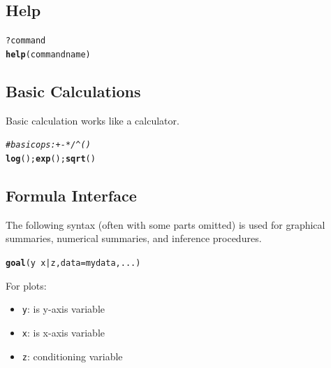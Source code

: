 \documentclass[10pt]{report}\usepackage[]{graphicx}\usepackage[]{xcolor}
\makeatletter
\newcommand{\hlcom}[1]{\textcolor[rgb]{0.678,0.584,0.686}{\textit{#1}}}%
\newcommand{\hlopt}[1]{\textcolor[rgb]{0,0,0}{#1}}%
\newcommand{\hldef}[1]{\textcolor[rgb]{0.345,0.345,0.345}{#1}}%
\newcommand{\hlkwc}[1]{\textcolor[rgb]{0.333,0.667,0.333}{#1}}%
\newcommand{\hlkwd}[1]{\textcolor[rgb]{0.737,0.353,0.396}{\textbf{#1}}}%
\newenvironment{kframe}{%
 \def\at@end@of@kframe{}%
 \ifinner\ifhmode%
  \def\at@end@of@kframe{\end{minipage}}%
  \begin{minipage}{\columnwidth}%
 \fi\fi%
 \def\FrameCommand##1{\hskip\@totalleftmargin \hskip-\fboxsep
 \colorbox{shadecolor}{##1}\hskip-\fboxsep
     \hskip-\linewidth \hskip-\@totalleftmargin \hskip\columnwidth}%
 \MakeFramed {\advance\hsize-\width
   \@totalleftmargin\z@ \linewidth\hsize
   \@setminipage}}%
 {\par\unskip\endMakeFramed%
 \at@end@of@kframe}
\newenvironment{knitrout}{}{} %
\makeatother
\begin{document}
\begin{multicols}{3}

\iftrue
\subsection*{Help}
\begin{knitrout}
\color{fgcolor}\begin{kframe}
\begin{alltt}
\hlopt{?}\hldef{command}
\hlkwd{help}\hldef{(commandname)}
\end{alltt}
\end{kframe}
\end{knitrout}
\fi

\subsection*{Basic Calculations}
Basic calculation works like a calculator.
\begin{knitrout}
\color{fgcolor}\begin{kframe}
\begin{alltt}
\hlcom{# basic ops: + - * / ^ ( )}
\hlkwd{log}\hldef{();} \hlkwd{exp}\hldef{();} \hlkwd{sqrt}\hldef{()}
\end{alltt}
\end{kframe}
\end{knitrout}
\squeeze




\subsection*{Formula Interface}
The following syntax (often with 
some parts omitted) is used for 
graphical summaries, numerical summaries,
and inference procedures.

\begin{knitrout}
\color{fgcolor}\begin{kframe}
\begin{alltt}
\hlkwd{goal}\hldef{(y} \hlopt{~} \hldef{x} \hlopt{|} \hldef{z,} \hlkwc{data} \hldef{= mydata, ...)}
\end{alltt}
\end{kframe}
\end{knitrout}

For plots:
\begin{itemize}
	\item
		\texttt{y}: is y-axis variable
	\item
		\texttt{x}: is x-axis variable
	\item
		\texttt{z}: conditioning variable 
		

\end{itemize}
\end{multicols}
\end{document}
